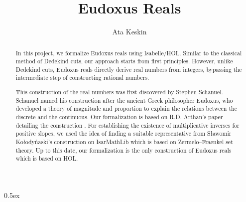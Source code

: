 \documentclass[11pt,a4paper]{article}
\begin{document}
\title{Eudoxus Reals}
\author{Ata Keskin}

\maketitle

\begin{abstract}
In this project, we formalize Eudoxus reals using Isabelle/HOL. Similar to the classical method of Dedekind cuts, our approach starts from first principles. However, unlike Dedekind cuts, Eudoxus reals directly derive real numbers from integers, bypassing the intermediate step of constructing rational numbers.

This construction of the real numbers was first discovered by Stephen Schanuel. Schanuel named his construction after the ancient Greek philosopher Eudoxus, who developed a theory of magnitude and proportion to explain the relations between the discrete and the continuous. Our formalization is based on R.D. Arthan's paper detailing the construction \cite{arthan2004eudoxus}. For establishing the existence of multiplicative inverses for positive slopes, we used the idea of finding a suitable representative from S\l awomir Ko\l ody\'naski's construction on IsarMathLib which is based on Zermelo--Fraenkel set theory. Up to this date, our formalization is the only construction of Eudoxus reals which is based on HOL.
\end{abstract}

\tableofcontents
\pagebreak
\parindent 0pt\parskip 0.5ex





\end{document}
